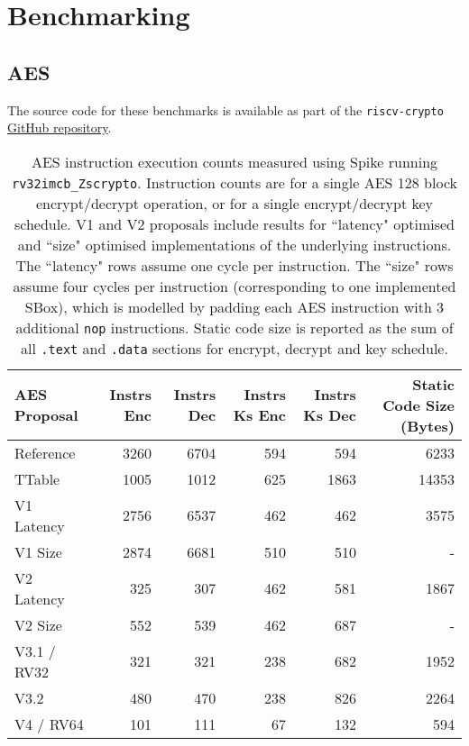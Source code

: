 
\section{Benchmarking}

\subsection{AES}
\label{sec:benchmark:aes}

The source code for these benchmarks is available as part of the
{\tt riscv-crypto} 
\href{\repourl{tree/master/benchmarks/crypto_block/aes}}{GitHub repository}.

\begin{table}[h]
\centering
\begin{tabular}{lrrrrr}
AES Proposal & Instrs Enc & Instrs Dec & Instrs Ks Enc & Instrs Ks Dec & Static Code Size (Bytes) \\ \hline
Reference   & 3260  & 6704  & 594  &  594  & 6233   \\
TTable      & 1005  & 1012  & 625  &  1863 & 14353  \\
V1 Latency  & 2756  & 6537  & 462  &  462  & 3575   \\
V1 Size     & 2874  & 6681  & 510  &  510  & -      \\
V2 Latency  & 325   & 307   & 462  &  581  & 1867   \\
V2 Size     & 552   & 539   & 462  &  687  & -      \\
V3.1 / RV32 & 321   & 321   & 238  &  682  & 1952   \\
V3.2        & 480   & 470   & 238  &  826  & 2264   \\
V4 / RV64   & 101   & 111   & 67   &  132  & 594     \\
\end{tabular}
\caption{
AES instruction execution counts measured using Spike
running {\tt rv32imcb\_Zscrypto}.
Instruction counts are for a single AES 128 block encrypt/decrypt operation,
or for a single encrypt/decrypt key schedule.
V1 and V2 proposals include results for ``latency" optimised and ``size"
optimised implementations of the underlying instructions.
The ``latency" rows assume one cycle per instruction.
The ``size" rows assume four cycles per instruction (corresponding to
one implemented SBox), which is modelled by padding each AES instruction
with 3 additional {\tt nop} instructions.
Static code size is reported as the sum of all {\tt .text} and {\tt .data}
sections for encrypt, decrypt and key schedule.
}
\label{tab:benchmarks:aes:perf}
\end{table}


